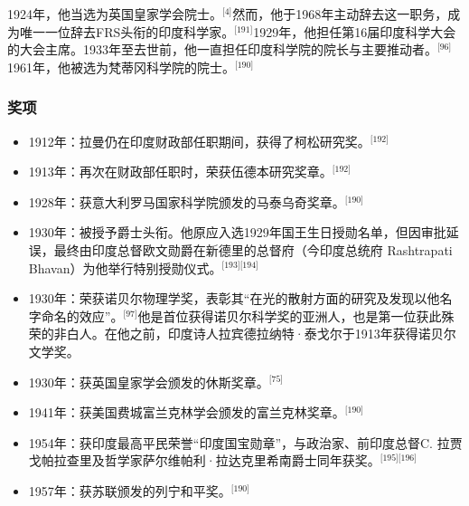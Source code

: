 1924年，他当选为英国皇家学会院士。\(^\text{[4]}\)然而，他于1968年主动辞去这一职务，成为唯一一位辞去FRS头衔的印度科学家。\(^\text{[191]}\)1929年，他担任第16届印度科学大会的大会主席。1933年至去世前，他一直担任印度科学院的院长与主要推动者。\(^\text{[96]}\)1961年，他被选为梵蒂冈科学院的院士。\(^\text{[190]}\)
\subsubsection{奖项}
\begin{itemize}
\item 1912年：拉曼仍在印度财政部任职期间，获得了柯松研究奖。\(^\text{[192]}\)
\item 1913年：再次在财政部任职时，荣获伍德本研究奖章。\(^\text{[192]}\)
\item 1928年：获意大利罗马国家科学院颁发的马泰乌奇奖章。\(^\text{[190]}\)
\item 1930年：被授予爵士头衔。他原应入选1929年国王生日授勋名单，但因审批延误，最终由印度总督欧文勋爵在新德里的总督府（今印度总统府 Rashtrapati Bhavan）为他举行特别授勋仪式。\(^\text{[193][194]}\)
\item 1930年：荣获诺贝尔物理学奖，表彰其“在光的散射方面的研究及发现以他名字命名的效应”。\(^\text{[97]}\)他是首位获得诺贝尔科学奖的亚洲人，也是第一位获此殊荣的非白人。在他之前，印度诗人拉宾德拉纳特·泰戈尔于1913年获得诺贝尔文学奖。
\item 1930年：获英国皇家学会颁发的休斯奖章。\(^\text{[75]}\)
\item 1941年：获美国费城富兰克林学会颁发的富兰克林奖章。\(^\text{[190]}\)
\item 1954年：获印度最高平民荣誉“印度国宝勋章”，与政治家、前印度总督C. 拉贾戈帕拉查里及哲学家萨尔维帕利·拉达克里希南爵士同年获奖。\(^\text{[195][196]}\)
\item 1957年：获苏联颁发的列宁和平奖。\(^\text{[190]}\)
\end{itemize}

